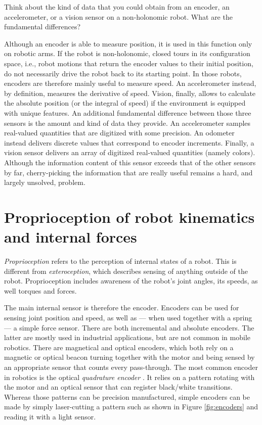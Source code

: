 \begin{framed}
Think about the kind of data that you could obtain from an encoder, an accelerometer, or a vision sensor on a non-holonomic robot. What are the fundamental differences?
\end{framed}
Although an encoder is able to measure position, it is used in this function only on robotic arms. If the robot is non-holonomic, closed tours in its configuration space, i.e., robot motions that return the encoder values to their initial position, do not necessarily drive the robot back to its starting point. In those robots, encoders are therefore mainly useful to measure speed. An accelerometer instead, by definition, measures the derivative of speed. Vision, finally, allows to calculate the absolute position (or the integral of speed) if the environment is equipped with unique features. An additional fundamental difference between those three sensors is the amount and kind of data they provide. An accelerometer samples real-valued quantities that are digitized with some precision. An odometer instead delivers discrete values that correspond to encoder increments. Finally, a vision sensor delivers an array of digitized real-valued quantities (namely colors). Although the information content of this sensor exceeds that of the other sensors by far, cherry-picking the information that are really useful remains a hard, and largely unsolved, problem.


\section{Proprioception of robot kinematics and internal forces}
\emph{Proprioception}  refers to the perception of internal states of a robot. 
This is different from \emph{exteroception}, which describes sensing of anything outside of the robot. Proprioception includes awareness of the robot's joint angles, its speeds, as well torques and forces.

The main internal sensor is therefore the encoder. Encoders can be used for sensing joint position and speed, as well as --- when used together with a spring --- a simple force sensor. There are both incremental and absolute encoders. The latter are mostly used in industrial applications, but are not common in mobile robotics. There are magnetical and optical encoders, which both rely on a magnetic or optical beacon turning together with the motor and being sensed by an appropriate sensor that counts every pass-through. The most common encoder in robotics is the optical \emph{quadrature encoder} . It relies on a pattern rotating with the motor and an optical sensor that can register black/white transitions. Whereas those patterns can be precision manufactured, simple encoders can be made by simply laser-cutting a pattern such as shown in Figure \ref{fig:encoders} and reading it with a light sensor.


